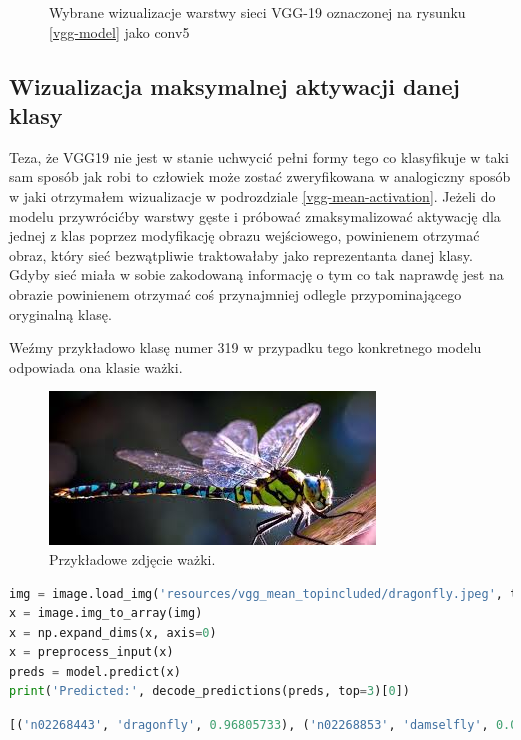 \begin{figure}
\caption{Wybrane wizualizacje warstwy sieci VGG-19 oznaczonej na rysunku \ref{vgg-model} jako conv5}
\label{mean-vgg-vis-c5bx}
\end{figure}

\subsection{Wizualizacja maksymalnej aktywacji danej klasy}
\label{vgg-class-visualisation}

Teza, że VGG19 nie jest w stanie uchwycić pełni formy tego co klasyfikuje w taki sam sposób jak robi to człowiek może zostać zweryfikowana w analogiczny sposób w jaki otrzymałem wizualizacje w podrozdziale \ref{vgg-mean-activation}.
Jeżeli do modelu przywrócićby warstwy gęste i próbować zmaksymalizować aktywację dla jednej z klas poprzez modyfikację obrazu wejściowego, powinienem otrzymać obraz, który sieć bezwątpliwie traktowałaby jako reprezentanta danej klasy.
Gdyby sieć miała w sobie zakodowaną informację o tym co tak naprawdę jest na obrazie powinienem otrzymać coś przynajmniej odlegle przypominającego oryginalną klasę.

Weźmy przykładowo klasę numer 319 w przypadku tego konkretnego modelu odpowiada ona klasie ważki. 

\begin{figure}[ht]
\centerline{\includegraphics[scale=0.8]{resources/vgg_mean_topincluded/dragonfly.jpeg}}
\caption{Przykładowe zdjęcie ważki.}
\label{fig:wazka-real}
\end{figure}

\label{lst:wazka-prediction}
\begin{lstlisting}[language=Python, caption={Predykcja klasy zdjęcia ważki\ref{fig:wazka-real}.}, captionpos=b]
img = image.load_img('resources/vgg_mean_topincluded/dragonfly.jpeg', target_size=(224, 224))
x = image.img_to_array(img)
x = np.expand_dims(x, axis=0)
x = preprocess_input(x)
preds = model.predict(x)
print('Predicted:', decode_predictions(preds, top=3)[0])
\end{lstlisting}

\label{lst:wazka-prediction-result}
\begin{lstlisting}[language=Python, caption={Wynik skryptu \ref{lst:wazka-prediction}.}, captionpos=b]
[('n02268443', 'dragonfly', 0.96805733), ('n02268853', 'damselfly', 0.01810956), ('n02264363', 'lacewing', 0.012446008)]
\end{lstlisting}

